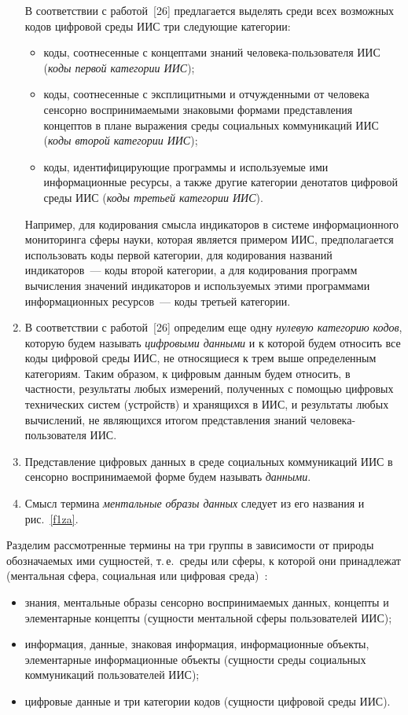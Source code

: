 \begin{multicols}{2}
\begin{enumerate}[1.]
   В соответствии с работой~[26] предлагается выделять среди всех возможных кодов
цифровой среды ИИС три следующие категории:
   \begin{itemize}
\item коды, соотнесенные с концептами знаний че\-ло\-ве\-ка-пользователя ИИС
(\textit{коды первой категории ИИС});
\item коды, соотнесенные с эксплицитными и отчужденными от человека сенсорно
воспринимаемыми знаковыми формами пред\-став\-ле\-ния концептов в плане выражения
среды социальных коммуникаций ИИС (\textit{коды второй категории ИИС});
\item коды, идентифицирующие программы и используемые ими информационные ресурсы,
а также другие категории денотатов цифровой среды ИИС (\textit{коды третьей
категории ИИС}).
\end{itemize}

   Например, для кодирования смысла индикаторов в системе информационного
мониторинга сферы науки, которая является примером ИИС, предполагается использовать
коды первой категории, для кодирования названий индикаторов~--- коды второй категории, а
для кодирования программ вычисления значений индикаторов и используемых этими
программами информационных ресурсов~--- коды третьей категории.
   \item В соответствии с работой~[26] определим еще одну \textit{нулевую
категорию кодов}, которую будем называть \textit{цифровыми данными} и к которой будем
относить все коды цифровой среды ИИС, не относящиеся к трем выше определенным
категориям. Таким образом, к цифровым данным будем относить, в частности, результаты
любых измерений, полученных с помощью цифровых технических систем (устройств) и
хранящихся в ИИС, и результаты любых вычислений, не являющихся итогом представления
знаний человека-поль\-зо\-ва\-те\-ля ИИС.
   \item Представление цифровых данных в среде социальных коммуникаций ИИС в
сенсорно воспринимаемой форме будем называть \textit{данными}.
   \item Смысл термина \textit{ментальные образы данных} следует из его названия и
рис.~\ref{f1za}.
   \end{enumerate}

   Разделим рассмотренные термины на три группы в зависимости от природы
обозначаемых ими сущностей, т.\,е.\ среды или сферы, к которой они принадлежат
(ментальная сфера, социальная или цифровая среда)~\cite{25za}:
   \begin{itemize}
\item знания, ментальные образы сенсорно воспринимаемых данных, концепты и
элементарные концепты (сущности ментальной сферы пользователей ИИС);
\item информация, данные, знаковая информация, информационные объекты,
элементарные информационные объекты (сущности среды социальных коммуникаций
пользователей ИИС);
\item цифровые данные и три категории кодов (сущности цифровой среды ИИС).
\end{itemize}


\end{multicols}
